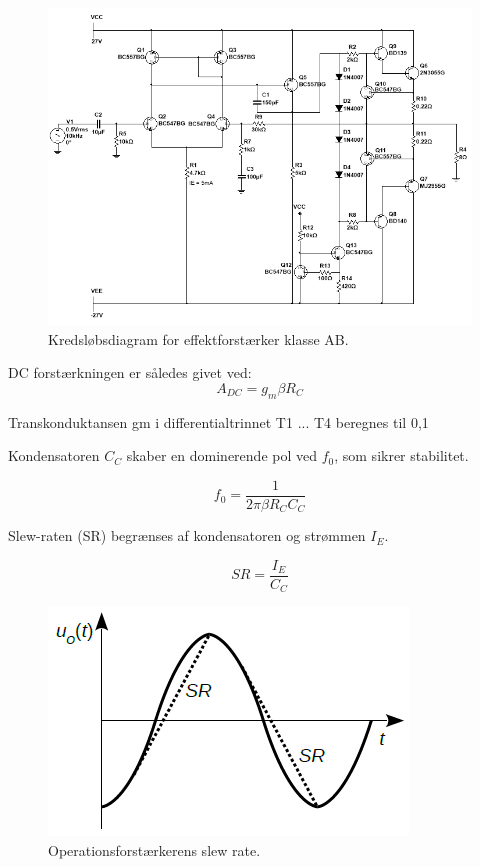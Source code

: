 \documentclass[danish]{article}
\begin{document}
\begin{figure} [H]
	\centering
	\includegraphics[width=\linewidth]{graphics/PowerAmp_schematic}
	\caption{Kredsløbsdiagram for effektforstærker klasse AB.}
	\label{fig:PowerAmp_schematic1}
\end{figure}
DC forstærkningen er således givet ved:
\begin{equation} 
A_{DC} = g_m \beta R_C
\end{equation}

Transkonduktansen gm i differentialtrinnet T1 ... T4 beregnes til 0,1 

Kondensatoren $C_C$ skaber en dominerende pol ved $f_0$, som sikrer stabilitet.

\begin{equation} 
f_0 = \dfrac{1}{2 \pi \beta R_C C_C}
\end{equation}

Slew-raten (SR) begrænses af kondensatoren og strømmen $I_E$.

\begin{equation} 
SR = \dfrac{I_E}{C_C}
\end{equation}

\begin{figure} [H]
	\centering
	\includegraphics[width=0.4\linewidth]{graphics/slewrate}
	\caption{Operationsforstærkerens slew rate.}
	\label{fig:slewrate}
\end{figure}
\end{document}
